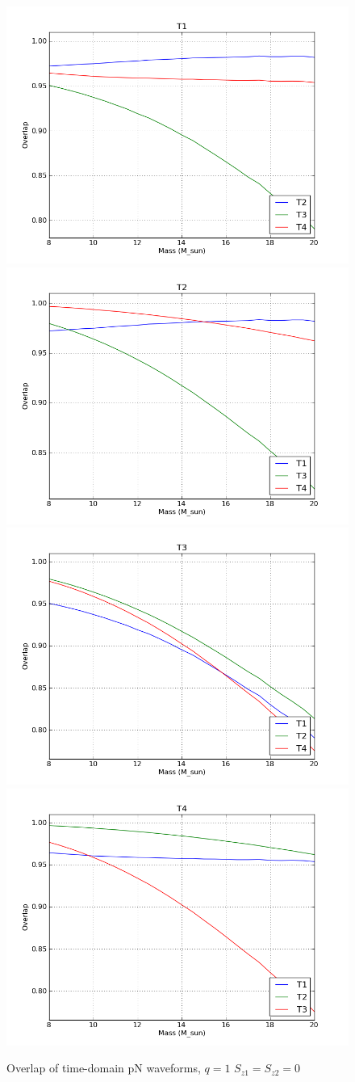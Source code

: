 \clearpage

\begin{figure}
  \includegraphics[width=0.5\linewidth]{figures/ninja2/pn_figure03.png} 
  \includegraphics[width=0.5\linewidth]{figures/ninja2/pn_figure06.png} \\
  \includegraphics[width=0.5\linewidth]{figures/ninja2/pn_figure09.png} 
  \includegraphics[width=0.5\linewidth]{figures/ninja2/pn_figure12.png} \\
  \caption[Overlap of time-domain pN waveforms, $q=1$ $S_{z1} = S_{z2} = 0$]{
  \label{f:figure_pn}
Overlap of time-domain pN waveforms, $q=1$ $S_{z1} = S_{z2} = 0$}
\end{figure}%

